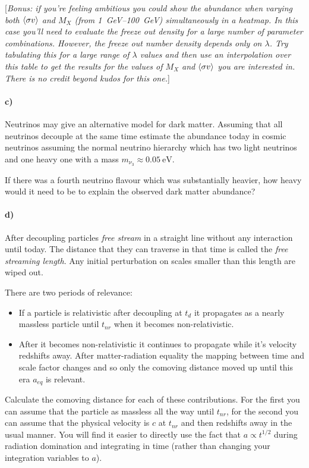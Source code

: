 \documentclass[12pt]{article}
\begin{document}
[\emph{Bonus: if you're feeling ambitious you could show the abundance when varying both $\langle \sigma v \rangle$ and $M_X$ (from \SIrange{1}{100}{\GeV}) simultaneously in a heatmap. In this case you'll need to evaluate the freeze out density for a large number of parameter combinations. However, the freeze out number density depends only on $\lambda$. Try tabulating this for a large range of $\lambda$ values and then use an interpolation over this table to get the results for the values of $M_X$ and $\langle \sigma v \rangle$ you are interested in. There is no credit beyond kudos for this one.}]

\paragraph{c)} Neutrinos may give an alternative model for dark matter. Assuming that all neutrinos decouple at the same time estimate the abundance today in cosmic neutrinos assuming the normal neutrino hierarchy which has two light neutrinos and one heavy one with a mass $m_{\nu_3} \approx \SI{0.05}{\electronvolt}$.

If there was a fourth neutrino flavour which was substantially heavier, how heavy would it need to be to explain the observed dark matter abundance?

\paragraph{d)} After decoupling particles \emph{free stream} in a straight line without any interaction until today. The distance that they can traverse in that time is called the \emph{free streaming length}. Any initial perturbation on scales smaller than this length are wiped out.

There are two periods of relevance:
\begin{itemize}
    \item If a particle is relativistic after decoupling at $t_d$ it propagates as a nearly massless particle until $t_{nr}$ when it becomes non-relativistic.
    \item After it becomes non-relativistic it continues to propagate while it's velocity redshifts away. After matter-radiation equality the mapping between time and scale factor changes and so only the comoving distance moved up until this era $a_{eq}$ is relevant.
\end{itemize}
Calculate the comoving distance for each of these contributions. For the first you can assume that the particle as massless all the way until $t_{nr}$, for the second you can assume that the physical velocity is $c$ at $t_{nr}$ and then redshifts away in the usual manner. You will find it easier to directly use the fact that $a \propto t^{1/2}$ during radiation domination and integrating in time (rather than changing your integration variables to $a$).
\end{document}
